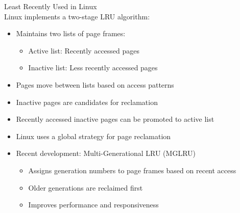 \begin{definition}{Least Recently Used in Linux}\\
    Linux implements a two-stage LRU algorithm:
    \begin{itemize}
        \item Maintains two lists of page frames:
            \begin{itemize}
                \item Active list: Recently accessed pages
                \item Inactive list: Less recently accessed pages
            \end{itemize}
        \item Pages move between lists based on access patterns
        \item Inactive pages are candidates for reclamation
        \item Recently accessed inactive pages can be promoted to active list
        \item Linux uses a global strategy for page reclamation
        \item Recent development: Multi-Generational LRU (MGLRU)
            \begin{itemize}
                \item Assigns generation numbers to page frames based on recent access
                \item Older generations are reclaimed first
                \item Improves performance and responsiveness
            \end{itemize}
    \end{itemize}
\end{definition}

